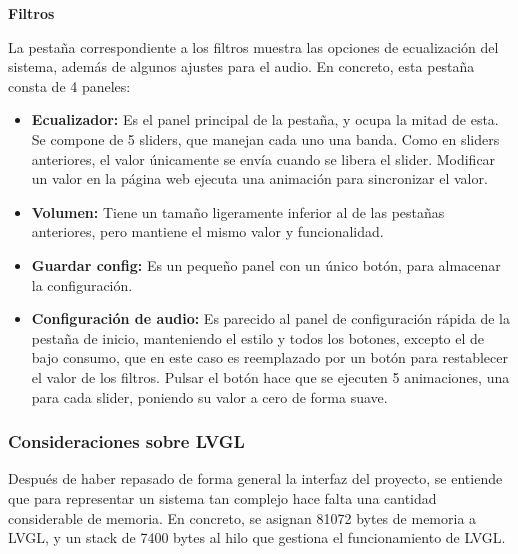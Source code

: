 \textbf{Filtros}

La pestaña correspondiente a los filtros muestra las opciones de ecualización del sistema, además de algunos ajustes para el audio. En concreto, esta pestaña consta de 4 paneles: 
\begin{itemize}
    \item \textbf{Ecualizador:} Es el panel principal de la pestaña, y ocupa la mitad de esta. Se compone de 5 sliders, que manejan cada uno una banda. Como en sliders anteriores, el valor únicamente se envía cuando se libera el slider. Modificar un valor en la página web ejecuta una animación para sincronizar el valor.
    \item \textbf{Volumen:} Tiene un tamaño ligeramente inferior al de las pestañas anteriores, pero mantiene el mismo valor y funcionalidad.
    \item \textbf{Guardar config:} Es un pequeño panel con un único botón, para almacenar la configuración.
    \item \textbf{Configuración de audio:} Es parecido al panel de configuración rápida de la pestaña de inicio, manteniendo el estilo y todos los botones, excepto el de bajo consumo, que en este caso es reemplazado por un botón para restablecer el valor de los filtros. Pulsar el botón hace que se ejecuten 5 animaciones, una para cada slider, poniendo su valor a cero de forma suave.
\end{itemize}

\subsubsection{Consideraciones sobre LVGL}

Después de haber repasado de forma general la interfaz del proyecto, se entiende que para representar un sistema tan complejo hace falta una cantidad considerable de memoria. En concreto, se asignan 81072 bytes de memoria a LVGL, y un stack de 7400 bytes al hilo que gestiona el funcionamiento de LVGL.
